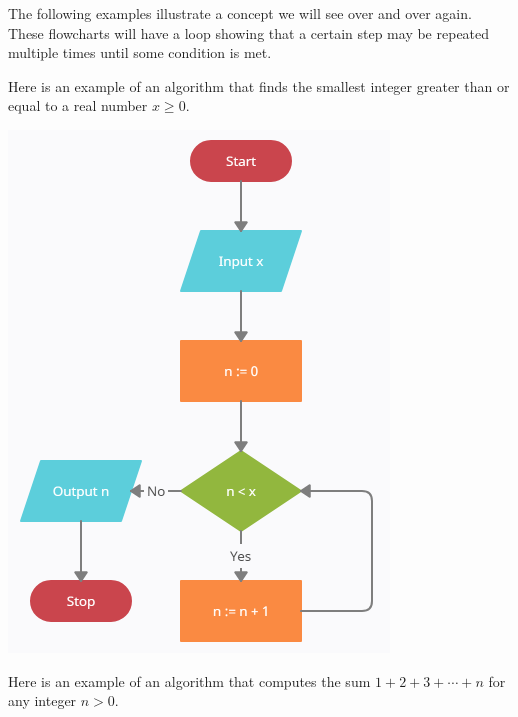 \documentclass{ximera}
\begin{document}
The following examples illustrate a concept we will see over and over again. These flowcharts will have a loop showing that a certain step may be repeated multiple times until some condition is met.

Here is an example of an algorithm that finds the smallest integer greater than or equal to a real number $x\geq 0$.

\begin{center}
	\includegraphics{ceil.png}
\end{center}

Here is an example of an algorithm that computes the sum $1+2+3+\cdots+n$ for any integer $n>0$.
\end{document}
